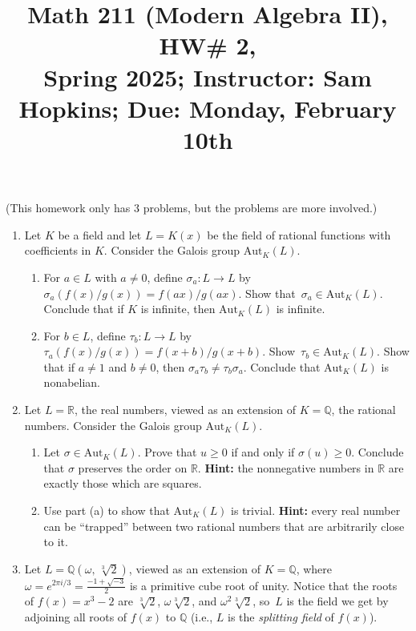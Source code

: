 \documentclass[11pt]{article}
\title{Math 211 (Modern Algebra II), HW\# 2, \\ {\normalsize Spring 2025; Instructor: Sam Hopkins; Due: Monday, February 10th}}
\date{}
\begin{document}
\maketitle

\thispagestyle{empty}

\noindent (This homework only has 3 problems, but the problems are more involved.)

\begin{enumerate}

\item Let $K$ be a field and let $L=K(x)$ be the field of rational functions with coefficients in $K$. Consider the Galois group $\mathrm{Aut}_{K}(L)$.
\begin{enumerate}
\item For $a \in L$ with $a \neq 0$, define $\sigma_a \colon L \to L$ by $\sigma_a( f(x) / g(x) ) = f(ax) / g(ax)$. Show that~$\sigma_a \in \mathrm{Aut}_{K}(L)$. Conclude that if $K$ is infinite, then $\mathrm{Aut}_{K}(L)$ is infinite.
\item For $b \in L$, define $\tau_b\colon L \to L$ by $\tau_a(f(x)/g(x)) = f(x+b) / g(x+b)$. Show~$\tau_b \in \mathrm{Aut}_{K}(L)$. Show that if $a \neq 1$ and $b \neq 0$, then $\sigma_a \tau_b \neq \tau_b \sigma_a$. Conclude that $\mathrm{Aut}_{K}(L)$ is nonabelian.
\end{enumerate}

\item Let $L=\mathbb{R}$, the real numbers, viewed as an extension of $K=\mathbb{Q}$, the rational numbers. Consider the Galois group $\mathrm{Aut}_{K}(L)$.
\begin{enumerate}
\item Let $\sigma \in \mathrm{Aut}_{K}(L)$. Prove that $u \geq 0$ if and only if $\sigma(u) \geq 0$. Conclude that $\sigma$ preserves the order on $\mathbb{R}$. {\bf Hint:} the nonnegative numbers in $\mathbb{R}$ are exactly those which are squares.
\item Use part (a) to show that $\mathrm{Aut}_{K}(L)$ is trivial. {\bf Hint:} every real number can be ``trapped'' between two rational numbers that are arbitrarily close to it.
\end{enumerate}

\item Let $L = \mathbb{Q}(\omega, \, \sqrt[3]{2})$, viewed as an extension of $K=\mathbb{Q}$, where $\omega = e^{2\pi i / 3} = \frac{-1+\sqrt{-3}}{2}$ is a primitive cube root of unity.  Notice that the roots of $f(x)=x^3-2$ are $\sqrt[3]{2}$, $\omega\sqrt[3]{2}$, and $\omega^2\sqrt[3]{2}$, so~$L$ is the field we get by adjoining all roots of $f(x)$ to $\mathbb{Q}$ (i.e., $L$ is the \emph{splitting field} of $f(x)$).


\end{enumerate}
\end{document}
